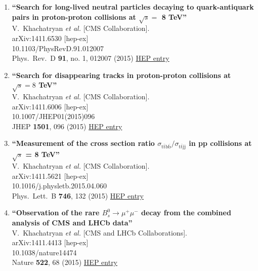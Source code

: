 \documentclass{article}
\begin{document}
\begin{enumerate}
\item%
{\bf ``Search for long-lived neutral particles decaying to quark-antiquark pairs in proton-proton collisions at $\sqrt{s} =$ 8 TeV''}
  \\{}V.~Khachatryan {\it et al.} [CMS Collaboration].
  \\{}arXiv:1411.6530 [hep-ex]
    \\{}10.1103/PhysRevD.91.012007
\\{}Phys.\ Rev.\ D {\bf 91}, no. 1, 012007 (2015) %
\href{http://inspirehep.net/record/1329792}{HEP entry}


\item%
{\bf ``Search for disappearing tracks in proton-proton collisions at $ \sqrt{s}=8 $ TeV''}
  \\{}V.~Khachatryan {\it et al.} [CMS Collaboration].
  \\{}arXiv:1411.6006 [hep-ex]
    \\{}10.1007/JHEP01(2015)096
\\{}JHEP {\bf 1501}, 096 (2015) %
\href{http://inspirehep.net/record/1329620}{HEP entry}


\item%
{\bf ``Measurement of the cross section ratio $\sigma_\mathrm{t \bar{t} b \bar{b}} / \sigma_\mathrm{t \bar{t}  jj }$ in pp collisions at $\sqrt{s}$ = 8 TeV''}
  \\{}V.~Khachatryan {\it et al.} [CMS Collaboration].
  \\{}arXiv:1411.5621 [hep-ex]
    \\{}10.1016/j.physletb.2015.04.060
\\{}Phys.\ Lett.\ B {\bf 746}, 132 (2015) %
\href{http://inspirehep.net/record/1328962}{HEP entry}


\item%
{\bf ``Observation of the rare $B^0_s\to\mu^+\mu^-$ decay from the combined analysis of CMS and LHCb data''}
  \\{}V.~Khachatryan {\it et al.} [CMS and LHCb Collaborations].
  \\{}arXiv:1411.4413 [hep-ex]
    \\{}10.1038/nature14474
\\{}Nature {\bf 522}, 68 (2015) %
\href{http://inspirehep.net/record/1328493}{HEP entry}



\end{enumerate}
\end{document}
